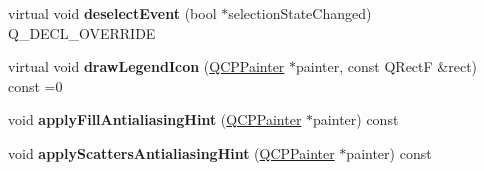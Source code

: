 \begin{DoxyCompactItemize}
\item 
\mbox{\label{class_q_c_p_abstract_plottable_ab8b5380cff6f96e6feb24c677e466587}} 
virtual void {\bfseries deselect\+Event} (bool $\ast$selection\+State\+Changed) Q\+\_\+\+D\+E\+C\+L\+\_\+\+O\+V\+E\+R\+R\+I\+DE
\item 
\mbox{\label{class_q_c_p_abstract_plottable_a71c259f4f96533d12df152c446b17425}} 
virtual void {\bfseries draw\+Legend\+Icon} (\hyperlink{class_q_c_p_painter}{Q\+C\+P\+Painter} $\ast$painter, const Q\+RectF \&rect) const =0
\item 
\mbox{\label{class_q_c_p_abstract_plottable_a8d06a59ea23324cce6330ebf2262c0ed}} 
void {\bfseries apply\+Fill\+Antialiasing\+Hint} (\hyperlink{class_q_c_p_painter}{Q\+C\+P\+Painter} $\ast$painter) const
\item 
\mbox{\label{class_q_c_p_abstract_plottable_ac95f26b15a1e5d9c7bd2c0a46d760fc9}} 
void {\bfseries apply\+Scatters\+Antialiasing\+Hint} (\hyperlink{class_q_c_p_painter}{Q\+C\+P\+Painter} $\ast$painter) const
\end{DoxyCompactItemize}
